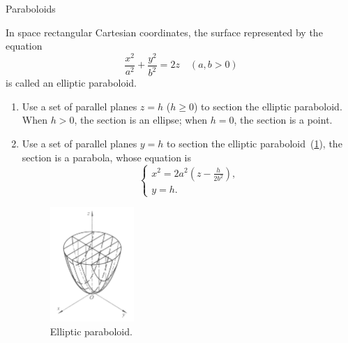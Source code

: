 \documentclass[11pt]{../../TexTemplate/elegantbook} %
\begin{document}
\begin{leftbarTitle}{Paraboloids}\end{leftbarTitle}
In space rectangular Cartesian coordinates, 
the surface represented by the equation
\[
\frac{x^{2}}{a^{2}} + \frac{y^{2}}{b^{2}} = 2z\quad (a,b > 0)
\]
is called an elliptic paraboloid.
\begin{enumerate}[label=\roman*.]
    \item Use a set of parallel planes \(z=h\) (\(h\geqslant 0\)) to section the elliptic paraboloid.
        When \(h>0\), the section is an ellipse;\newline
        when \(h=0\), the section is a point.
    \item Use a set of parallel planes \(y=h\) to section the elliptic paraboloid~(\ref{fig:EllipticParaboloid}),
        the section is a parabola, whose equation is
        \[
        \begin{cases} x^{2} = 2a^{2}(z-\frac{h}{2b^{2}}), \\ y=h. \end{cases}
        \]
        \begin{figure}[h]
            \centering
            \includegraphics[width=0.3\textwidth]{img/elliptic-paraboloid.png}
            \caption{Elliptic paraboloid.}
            \label{fig:EllipticParaboloid}
        \end{figure}
\end{enumerate}
\end{document}
